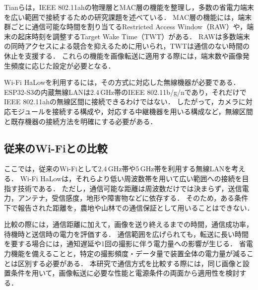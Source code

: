 Tianら\cite{Tian2021}は，IEEE 802.11ahの物理層とMAC層の機能を整理し，多数の省電力端末を広い範囲で接続するための研究課題を述べている．
MAC層の機能には，端末群ごとに通信可能な時間を割り当てるRestricted Access Window（RAW）や，端末の起床時刻を調整するTarget Wake Time（TWT）がある．
RAWは多数端末の同時アクセスによる競合を抑えるために用いられ，TWTは通信のない時間の休止を支援する．
これらの機能を画像転送に適用する際には，端末数や画像発生頻度に応じた設定が必要となる．

Wi-Fi HaLowを利用するには，その方式に対応した無線機器が必要である．
ESP32-S3の内蔵無線LANは2.4\,GHz帯のIEEE 802.11b/g/nであり，それだけでIEEE 802.11ahの無線区間に接続できるわけではない\cite{ESP32S3,HaLowOverview}．
したがって，カメラに対応モジュールを接続する構成や，対応する中継機器を用いる構成など，無線区間と既存機器の接続方法を明確にする必要がある．

\subsection{従来のWi-Fiとの比較}
ここでは，従来のWi-Fiとして2.4\,GHz帯や5\,GHz帯を利用する無線LANを考える．
Wi-Fi HaLowは，それらより低い周波数帯を用いて広い範囲への接続を目指す技術である\cite{Tian2021,HaLowOverview}．
ただし，通信可能な距離は周波数だけでは決まらず，送信電力，アンテナ，受信感度，地形や障害物などに依存する．
そのため，ある条件下で報告された距離を，農地や山林での通信保証として用いることはできない．

比較の際には，通信距離に加えて，画像を送り終えるまでの時間，通信成功率，待機時と送信時の電力を評価する．
通信範囲を広げられても，転送に長い時間を要する場合には，通知遅延や1回の撮影に伴う電力量への影響が生じる．
省電力機能を備えることと，特定の撮影頻度・データ量で装置全体の電力量が減ることは区別する必要がある．
本研究で通信方式を比較する際には，同じ画像と設置条件を用いて，画像転送に必要な性能と電源条件の両面から適用性を検討する．
